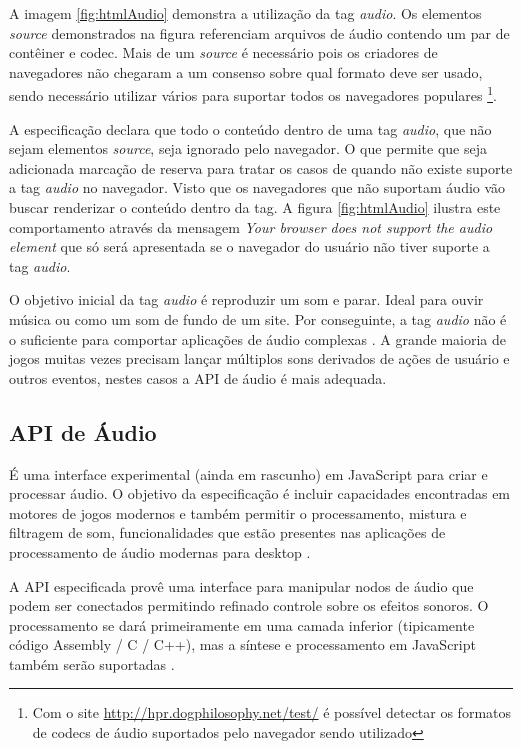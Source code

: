 A imagem \ref{fig:htmlAudio} demonstra a utilização da tag
\textit{audio}. Os elementos \textit{source} demonstrados na figura
referenciam arquivos de áudio contendo um par de contêiner
e codec. Mais de um \textit{source } é necessário pois os
criadores de navegadores não chegaram a um consenso sobre qual
formato deve ser usado, sendo necessário utilizar vários para
suportar todos os navegadores populares \footnote{Com o site
\url{http://hpr.dogphilosophy.net/test/} é possível detectar os
formatos de codecs de áudio suportados pelo navegador sendo utilizado}.

A especificação declara que todo o conteúdo dentro de uma tag
\textit{audio}, que não sejam elementos \textit{source}, seja
ignorado pelo navegador. O que permite que seja adicionada marcação
de reserva para tratar os casos de quando não existe suporte a tag
\textit{audio} no navegador. Visto que os navegadores que não suportam
áudio vão buscar renderizar o conteúdo dentro da tag. A figura
\ref{fig:htmlAudio} ilustra este comportamento através da mensagem
\textit{Your browser does not support the audio element } que só
será apresentada se o navegador do usuário não tiver suporte a tag
\textit{audio}.

O objetivo inicial da tag \textit{audio} é reproduzir um som e parar.
Ideal para ouvir música ou como um som de fundo de um site. Por
conseguinte, a tag \textit{audio} não é o suficiente para comportar
aplicações de áudio complexas \autocite{audioApiSpec}. A grande
maioria de jogos muitas vezes precisam lançar múltiplos sons derivados
de ações de usuário e outros eventos, nestes casos a API de áudio é
mais adequada.

\subsection{API de Áudio}

É uma interface experimental (ainda em rascunho) em JavaScript para
criar e processar áudio. O objetivo da especificação é incluir
capacidades encontradas em motores de jogos modernos e também permitir
o processamento, mistura e filtragem de som, funcionalidades que estão
presentes nas aplicações de processamento de áudio modernas para
desktop \autocite{audioApiSpec}.

A API especificada provê uma interface para manipular nodos de áudio
que podem ser conectados permitindo refinado controle sobre os efeitos
sonoros. O processamento se dará primeiramente em uma camada inferior
(tipicamente código Assembly / C / C++), mas a síntese e processamento
em JavaScript também serão suportadas \autocite{audioApiSpec}.

